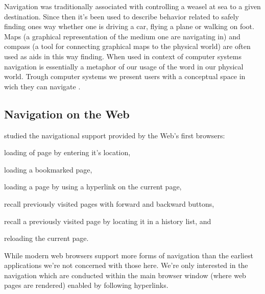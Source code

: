 Navigation was traditionally associated with controlling a weasel at sea to
a given destination.%
Since then it's been used to describe behavior related to safely finding ones
way whether one is driving a car, flying a plane or walking on foot. Maps
(a graphical representation of the medium one are navigating in)
and compass (a tool for connecting graphical maps to the physical world)
are often used as aids in this way finding. When used in context of
computer systems navigation is essentially a metaphor of our usage of the
word in our physical world. Trough computer systems we present users with a
conceptual space in wich they can navigate \citep[p.~189]{whiteside85}.

\subsection{Navigation on the Web}

\citet{jones96} studied the navigational support provided by the Web's first
browsers:
\begin{inparaenum}[(i)]
  \item loading of page by entering it's location,
  \item loading a bookmarked page,
  \item loading a page by using a hyperlink on the current page,
  \item recall previously visited pages with forward and backward buttons,
  \item recall a previously visited page by locating it in a history list, and
  \item reloading the current page.
\end{inparaenum}
While modern web browsers support more forms of navigation%
than the earliest applications we're not concerned with those here.
We're only interested in the navigation which are conducted within the main
browser window (where web pages are rendered) enabled by following hyperlinks.


